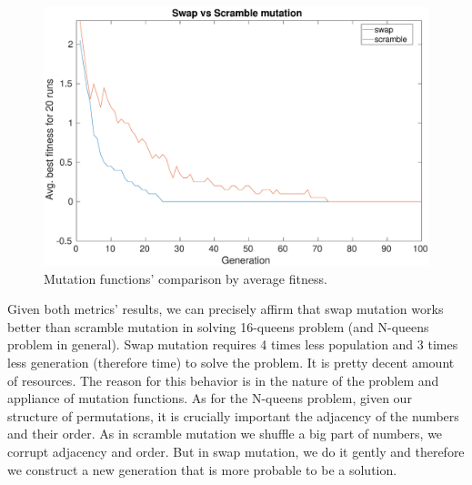 \documentclass[12pt, a4paper]{article}
\begin{document}
        \begin{figure}[H]
            \centering
            \includegraphics[width=\linewidth]{comparison_avg_fitness}
            \caption{Mutation functions' comparison by average fitness.}
            \label{fig:comp_avg_fit}
        \end{figure}

        Given both metrics' results, we can precisely affirm that swap mutation
        works better than scramble mutation in solving 16-queens problem (and
        N-queens problem in general). Swap mutation requires 4 times less
        population and 3 times less generation (therefore time) to solve the
        problem. It is pretty decent amount of resources. The reason for this
        behavior is in the nature of the problem and appliance of mutation
        functions. As for the N-queens problem, given our structure of permutations,
        it is crucially important the adjacency of the numbers and their order.
        As in scramble mutation we shuffle a big part of numbers, we corrupt
        adjacency and order. But in swap mutation, we do it gently and therefore
        we construct a new generation that is more probable to be a solution.
\end{document}
